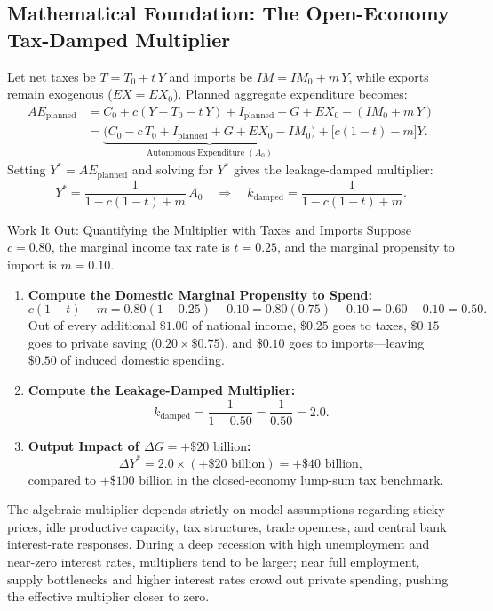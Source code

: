 \documentclass[11pt,letterpaper]{article}
\begin{document}
\subsection*{Mathematical Foundation: The Open-Economy Tax-Damped Multiplier}
Let net taxes be $T = T_0 + t\,Y$ and imports be $IM = IM_0 + m\,Y$, while exports remain exogenous ($EX = EX_0$). Planned aggregate expenditure becomes:
\begin{align}
AE_{\text{planned}} &= C_0 + c(Y - T_0 - t\,Y) + I_{\text{planned}} + G + EX_0 - (IM_0 + m\,Y) \nonumber \\
&= \underbrace{\bigl(C_0 - c\,T_0 + I_{\text{planned}} + G + EX_0 - IM_0\bigr)}_{\text{Autonomous Expenditure } (A_0)} + \bigl[c(1 - t) - m\bigr]Y.
\end{align}
Setting $Y^* = AE_{\text{planned}}$ and solving for $Y^*$ gives the leakage-damped multiplier:
\begin{equation}
Y^* = \frac{1}{1 - c(1 - t) + m}\,A_0 \quad \Longrightarrow \quad k_{\text{damped}} = \frac{1}{1 - c(1 - t) + m}. \label{eq:ch8-damped-multiplier}
\end{equation}

\begin{examplecase}{Work It Out: Quantifying the Multiplier with Taxes and Imports}
Suppose $c = 0.80$, the marginal income tax rate is $t = 0.25$, and the marginal propensity to import is $m = 0.10$.
\begin{enumerate}
    \item \textbf{Compute the Domestic Marginal Propensity to Spend:}
    \[
    c(1 - t) - m = 0.80(1 - 0.25) - 0.10 = 0.80(0.75) - 0.10 = 0.60 - 0.10 = 0.50.
    \]
    Out of every additional $\$1.00$ of national income, $\$0.25$ goes to taxes, $\$0.15$ goes to private saving ($0.20 \times \$0.75$), and $\$0.10$ goes to imports—leaving $\$0.50$ of induced domestic spending.
    \item \textbf{Compute the Leakage-Damped Multiplier:}
    \[
    k_{\text{damped}} = \frac{1}{1 - 0.50} = \frac{1}{0.50} = 2.0.
    \]
    \item \textbf{Output Impact of $\Delta G = +\$20\text{ billion}$:}
    \[
    \Delta Y^* = 2.0 \times (+\$20\text{ billion}) = +\$40\text{ billion},
    \]
    compared to $+\$100\text{ billion}$ in the closed-economy lump-sum tax benchmark.
\end{enumerate}
\end{examplecase}

\begin{coreprinciple}
The algebraic multiplier depends strictly on model assumptions regarding sticky prices, idle productive capacity, tax structures, trade openness, and central bank interest-rate responses. During a deep recession with high unemployment and near-zero interest rates, multipliers tend to be larger; near full employment, supply bottlenecks and higher interest rates crowd out private spending, pushing the effective multiplier closer to zero.
\end{coreprinciple}
\end{document}

